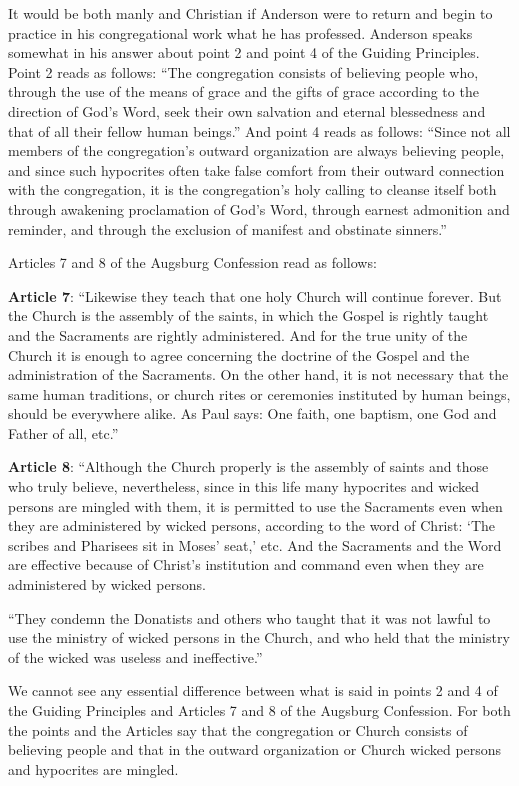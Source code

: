 It would be both manly and Christian if Anderson were to return and begin to practice in his congregational work what he has professed. Anderson speaks somewhat in his answer about point 2 and point 4 of the Guiding Principles. Point 2 reads as follows: “The congregation consists of believing people who, through the use of the means of grace and the gifts of grace according to the direction of God’s Word, seek their own salvation and eternal blessedness and that of all their fellow human beings.” And point 4 reads as follows: “Since not all members of the congregation’s outward organization are always believing people, and since such hypocrites often take false comfort from their outward connection with the congregation, it is the congregation’s holy calling to cleanse itself both through awakening proclamation of God’s Word, through earnest admonition and reminder, and through the exclusion of manifest and obstinate sinners.”

Articles 7 and 8 of the Augsburg Confession read as follows:

\textbf{Article 7}: “Likewise they teach that one holy Church will continue forever. But the Church is the assembly of the saints, in which the Gospel is rightly taught and the Sacraments are rightly administered. And for the true unity of the Church it is enough to agree concerning the doctrine of the Gospel and the administration of the Sacraments. On the other hand, it is not necessary that the same human traditions, or church rites or ceremonies instituted by human beings, should be everywhere alike. As Paul says: One faith, one baptism, one God and Father of all, etc.”

\textbf{Article 8}: “Although the Church properly is the assembly of saints and those who truly believe, nevertheless, since in this life many hypocrites and wicked persons are mingled with them, it is permitted to use the Sacraments even when they are administered by wicked persons, according to the word of Christ: ‘The scribes and Pharisees sit in Moses’ seat,’ etc. And the Sacraments and the Word are effective because of Christ’s institution and command even when they are administered by wicked persons.

“They condemn the Donatists and others who taught that it was not lawful to use the ministry of wicked persons in the Church, and who held that the ministry of the wicked was useless and ineffective.”

We cannot see any essential difference between what is said in points 2 and 4 of the Guiding Principles and Articles 7 and 8 of the Augsburg Confession. For both the points and the Articles say that the congregation or Church consists of believing people and that in the outward organization or Church wicked persons and hypocrites are mingled.


